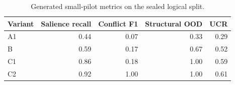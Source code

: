 \begin{table}[t]
\centering\scriptsize
\caption{Generated small-pilot metrics on the sealed logical split.}
\label{tab:generated-primary-results}
\begin{tabular}{lrrrr}
\toprule
Variant & Salience recall & Conflict F1 & Structural OOD & UCR\\
\midrule
A1 & 0.44 & 0.07 & 0.33 & 0.29\\
B & 0.59 & 0.17 & 0.67 & 0.52\\
C1 & 0.86 & 0.18 & 1.00 & 0.59\\
C2 & 0.92 & 1.00 & 1.00 & 0.61\\
\bottomrule
\end{tabular}
\end{table}


